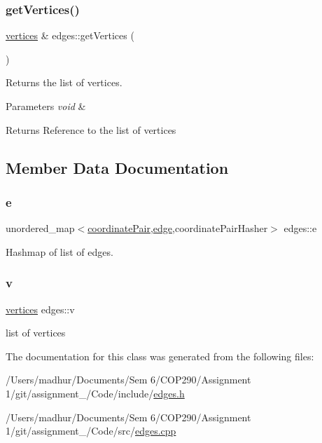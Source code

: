 \subsubsection{\texorpdfstring{get\+Vertices()}{getVertices()}}
{\footnotesize\ttfamily \mbox{\hyperlink{classvertices}{vertices}} \& edges\+::get\+Vertices (\begin{DoxyParamCaption}{ }\end{DoxyParamCaption})}



Returns the list of vertices. 


\begin{DoxyParams}{Parameters}
{\em void} & \\
\hline
\end{DoxyParams}
\begin{DoxyReturn}{Returns}
Reference to the list of vertices 
\end{DoxyReturn}


\subsection{Member Data Documentation}
\mbox{\label{classedges_afc125c17ccbdc0e6fd9728c46b8161d6}} 
\subsubsection{\texorpdfstring{e}{e}}
{\footnotesize\ttfamily unordered\+\_\+map$<$\mbox{\hyperlink{structcoordinate_pair}{coordinate\+Pair}},\mbox{\hyperlink{structedge}{edge}},coordinate\+Pair\+Hasher$>$ edges\+::e\hspace{0.3cm}{\ttfamily [private]}}



Hashmap of list of edges. 

\mbox{\label{classedges_ae7d192ac53a71df3fef15146552351fa}} 
\subsubsection{\texorpdfstring{v}{v}}
{\footnotesize\ttfamily \mbox{\hyperlink{classvertices}{vertices}} edges\+::v\hspace{0.3cm}{\ttfamily [private]}}



list of vertices 



The documentation for this class was generated from the following files\+:\begin{DoxyCompactItemize}
\item 
/\+Users/madhur/\+Documents/\+Sem 6/\+C\+O\+P290/\+Assignment 1/git/assignment\+\_/\+Code/include/\mbox{\hyperlink{edges_8h}{edges.\+h}}\item 
/\+Users/madhur/\+Documents/\+Sem 6/\+C\+O\+P290/\+Assignment 1/git/assignment\+\_/\+Code/src/\mbox{\hyperlink{edges_8cpp}{edges.\+cpp}}\end{DoxyCompactItemize}
